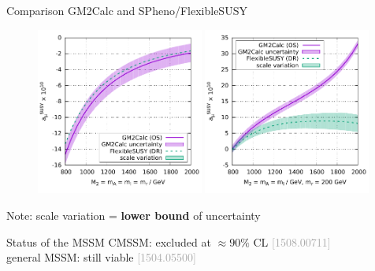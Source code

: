 \documentclass[hyperref={pdfpagelabels=false},ngerman]{beamer}
\newcommand{\mycite}[1]{\textcolor{darkgray}{\tiny [#1]}}
\renewcommand{\emph}{\textbf}
\begin{document}
\begin{frame}{Comparison GM2Calc and SPheno/FlexibleSUSY}
  \begin{figure}
    \centering
    \includegraphics[width=0.49\textwidth]{plots/OS-vs-DR}
    \includegraphics[width=0.49\textwidth]{plots/OS-vs-DR_splitting}
  \end{figure}
  Note: scale variation = \emph{lower bound} of uncertainty
\end{frame}

\begin{frame}{Status of the MSSM}
  CMSSM: excluded at $\approx 90\%$ CL \mycite{1508.00711} \\
  general MSSM: still viable \mycite{1504.05500} \\
\end{frame}
\end{document}
